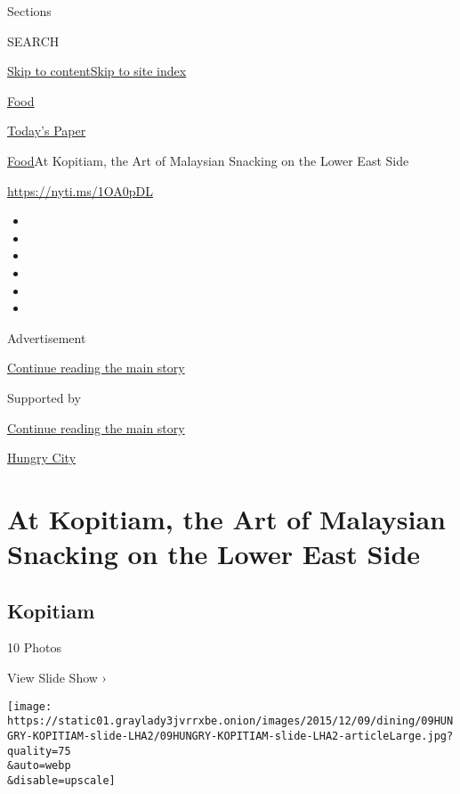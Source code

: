 Sections

SEARCH

\protect\hyperlink{site-content}{Skip to
content}\protect\hyperlink{site-index}{Skip to site index}

\href{https://www.nytimes3xbfgragh.onion/section/food}{Food}

\href{https://myaccount.nytimes3xbfgragh.onion/auth/login?response_type=cookie\&client_id=vi}{}

\href{https://www.nytimes3xbfgragh.onion/section/todayspaper}{Today's
Paper}

\href{/section/food}{Food}\textbar{}At Kopitiam, the Art of Malaysian
Snacking on the Lower East Side

\url{https://nyti.ms/1OA0pDL}

\begin{itemize}
\item
\item
\item
\item
\item
\item
\end{itemize}

Advertisement

\protect\hyperlink{after-top}{Continue reading the main story}

Supported by

\protect\hyperlink{after-sponsor}{Continue reading the main story}

\href{/column/hungry-city}{Hungry City}

\hypertarget{at-kopitiam-the-art-of-malaysian-snacking-on-the-lower-east-side}{%
\section{At Kopitiam, the Art of Malaysian Snacking on the Lower East
Side}\label{at-kopitiam-the-art-of-malaysian-snacking-on-the-lower-east-side}}

\href{https://www.nytimes3xbfgragh.onion/slideshow/2015/12/09/dining/kopitiam.html}{}

\hypertarget{kopitiam}{%
\subsection{Kopitiam}\label{kopitiam}}

10 Photos

View Slide Show ›

\texttt{[image: https://static01.graylady3jvrrxbe.onion/images/2015/12/09/dining/09HUNGRY-KOPITIAM-slide-LHA2/09HUNGRY-KOPITIAM-slide-LHA2-articleLarge.jpg?quality=75\\\&auto=webp\\\&disable=upscale]}

